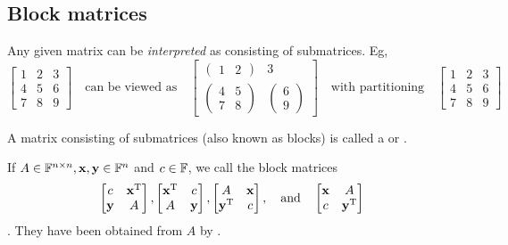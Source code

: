 \subsection{Block matrices}
Any given matrix can be \textit{interpreted} as consisting of submatrices. Eg,
\[ \begin{bmatrix}
1&2&3\\4&5&6\\7&8&9
\end{bmatrix} \quad \text{can be viewed as} \quad 
\begin{bmatrix}
\begin{pmatrix}
1 & 2
\end{pmatrix} & 3 \\
\begin{pmatrix}
4 & 5 \\ 7 & 8
\end{pmatrix} & \begin{pmatrix}
6 \\ 9
\end{pmatrix}
\end{bmatrix}
\quad \text{with partitioning} \quad
\left[\begin{array}{cc|c}
1&2&3\\ \hline
4&5&6\\7&8&9
\end{array}\right]
 \]
\begin{definition}
A matrix consisting of submatrices (also known as blocks) is called a  or .

If $A\in\mathbb{F}^{n\times n}, \boldsymbol{\mathrm{x}},\boldsymbol{\mathrm{y}}\in\mathbb{F}^n$ and $c\in \mathbb{F}$, we call the block matrices
\[ \begin{bmatrix}
c & \boldsymbol{\mathrm{x}}^{\mathrm{T}} \\ \boldsymbol{\mathrm{y}} & A
\end{bmatrix}, \begin{bmatrix}
\boldsymbol{\mathrm{x}}^{\mathrm{T}} & c \\ A & \boldsymbol{\mathrm{y}}
\end{bmatrix}, \begin{bmatrix}
A & \boldsymbol{\mathrm{x}} \\
\boldsymbol{\mathrm{y}}^{\mathrm{T}} & c
\end{bmatrix}, \quad\text{and}\quad \begin{bmatrix}
\boldsymbol{\mathrm{x}} & A \\ c & \boldsymbol{\mathrm{y}}^{\mathrm{T}}
\end{bmatrix} \]
. They have been obtained from $A$ by .
\end{definition}

